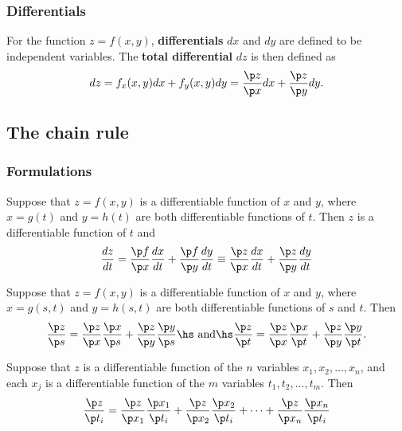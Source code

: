 \documentclass{article}
\begin{document}
\subsubsection{Differentials}

\begin{definition}
	For the function $z=f(x,y)$, \textbf{differentials} $dx$ and $dy$ are
	defined to be independent variables. The \textbf{total differential} $dz$
	is then defined as
	\begin{align*}
		dz = f_x(x,y)dx + f_y(x,y)dy
		= \frac{\p z}{\p x}dx + \frac{\p z}{\p y}dy.
	\end{align*}
\end{definition}


\subsection{The chain rule}


\subsubsection{Formulations}

\begin{theorem}
	Suppose that $z=f(x,y)$ is a differentiable function of $x$ and $y$,
	where $x=g(t)$ and $y=h(t)$ are both differentiable functions of $t$.
	Then $z$ is a differentiable function of $t$ and
	\begin{align*}
		\frac{dz}{dt}=
		\frac{\p f}{\p x}\frac{dx}{dt}+\frac{\p f}{\p y}\frac{dy}{dt}
		\equiv \frac{\p z}{\p x}\frac{dx}{dt}+\frac{\p z}{\p y}\frac{dy}{dt}
	\end{align*}
\end{theorem}
\begin{theorem}
	Suppose that $z=f(x,y)$ is a differentiable function of $x$ and $y$,
	where $x=g(s,t)$ and $y=h(s,t)$ are both differentiable functions of
	$s$ and $t$. Then
	\begin{align*}
		\frac{\p z}{\p s}=\frac{\p z}{\p x}\frac{\p x}{\p s}
		+ \frac{\p z}{\p y}\frac{\p y}{\p s}
		\text{\hs and\hs}
		\frac{\p z}{\p t}=\frac{\p z}{\p x}\frac{\p x}{\p t}
		+ \frac{\p z}{\p y}\frac{\p y}{\p t}.
	\end{align*}
\end{theorem}
\begin{theorem}
	Suppose that $z$ is a differentiable function of the $n$ variables
	$x_1, x_2, ..., x_n$, and each $x_j$ is a differentiable function of
	the $m$ variables $t_1,t_2, ...,t_m$. Then
	\begin{align*}
		\frac{\p z}{\p t_i}=
		\frac{\p z}{\p x_1}\frac{\p x_1}{\p t_i}
		+ \frac{\p z}{\p x_2}\frac{\p x_2}{\p t_i}
		+ \cdots
		+ \frac{\p z}{\p x_n}\frac{\p x_n}{\p t_i}
	\end{align*}
\end{theorem}
\end{document}
